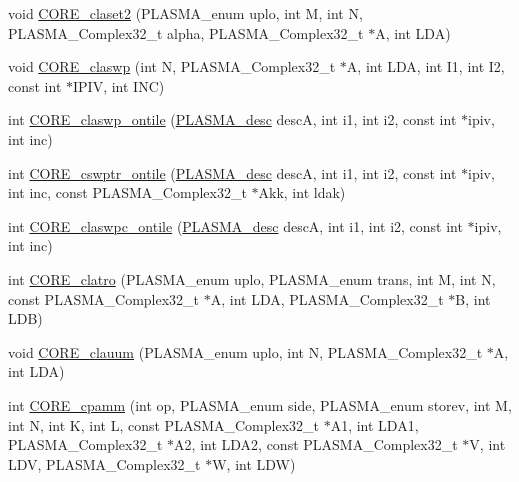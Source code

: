\begin{DoxyCompactItemize}
\item 
void \hyperlink{group__CORE__PLASMA__Complex32__t_gac08e91310fd70351d27546eb488fbd81_gac08e91310fd70351d27546eb488fbd81}{C\+O\+R\+E\+\_\+claset2} (P\+L\+A\+S\+M\+A\+\_\+enum uplo, int M, int N, P\+L\+A\+S\+M\+A\+\_\+\+Complex32\+\_\+t alpha, P\+L\+A\+S\+M\+A\+\_\+\+Complex32\+\_\+t $\ast$A, int L\+D\+A)
\item 
void \hyperlink{group__CORE__PLASMA__Complex32__t_gae932091627c46b688b67aebcfb537573_gae932091627c46b688b67aebcfb537573}{C\+O\+R\+E\+\_\+claswp} (int N, P\+L\+A\+S\+M\+A\+\_\+\+Complex32\+\_\+t $\ast$A, int L\+D\+A, int I1, int I2, const int $\ast$I\+P\+I\+V, int I\+N\+C)
\item 
int \hyperlink{group__CORE__PLASMA__Complex32__t_ga18336def276ef2189f9e51afc1976624_ga18336def276ef2189f9e51afc1976624}{C\+O\+R\+E\+\_\+claswp\+\_\+ontile} (\hyperlink{structplasma__desc__t}{P\+L\+A\+S\+M\+A\+\_\+desc} desc\+A, int i1, int i2, const int $\ast$ipiv, int inc)
\item 
int \hyperlink{group__CORE__PLASMA__Complex32__t_gaf715646956e16c2ad05d66b58fc8ffad_gaf715646956e16c2ad05d66b58fc8ffad}{C\+O\+R\+E\+\_\+cswptr\+\_\+ontile} (\hyperlink{structplasma__desc__t}{P\+L\+A\+S\+M\+A\+\_\+desc} desc\+A, int i1, int i2, const int $\ast$ipiv, int inc, const P\+L\+A\+S\+M\+A\+\_\+\+Complex32\+\_\+t $\ast$Akk, int ldak)
\item 
int \hyperlink{group__CORE__PLASMA__Complex32__t_ga50a473e33ed85bf4b07d1b9a441a9731_ga50a473e33ed85bf4b07d1b9a441a9731}{C\+O\+R\+E\+\_\+claswpc\+\_\+ontile} (\hyperlink{structplasma__desc__t}{P\+L\+A\+S\+M\+A\+\_\+desc} desc\+A, int i1, int i2, const int $\ast$ipiv, int inc)
\item 
int \hyperlink{group__CORE__PLASMA__Complex32__t_gafe9ffac6e225949a3a0d13f084db12cb_gafe9ffac6e225949a3a0d13f084db12cb}{C\+O\+R\+E\+\_\+clatro} (P\+L\+A\+S\+M\+A\+\_\+enum uplo, P\+L\+A\+S\+M\+A\+\_\+enum trans, int M, int N, const P\+L\+A\+S\+M\+A\+\_\+\+Complex32\+\_\+t $\ast$A, int L\+D\+A, P\+L\+A\+S\+M\+A\+\_\+\+Complex32\+\_\+t $\ast$B, int L\+D\+B)
\item 
void \hyperlink{group__CORE__PLASMA__Complex32__t_ga524ade90166bbf2514e1259685dc603e_ga524ade90166bbf2514e1259685dc603e}{C\+O\+R\+E\+\_\+clauum} (P\+L\+A\+S\+M\+A\+\_\+enum uplo, int N, P\+L\+A\+S\+M\+A\+\_\+\+Complex32\+\_\+t $\ast$A, int L\+D\+A)
\item 
int \hyperlink{group__CORE__PLASMA__Complex32__t_ga1cba20dafe66a5e6fd0ba87604120002_ga1cba20dafe66a5e6fd0ba87604120002}{C\+O\+R\+E\+\_\+cpamm} (int op, P\+L\+A\+S\+M\+A\+\_\+enum side, P\+L\+A\+S\+M\+A\+\_\+enum storev, int M, int N, int K, int L, const P\+L\+A\+S\+M\+A\+\_\+\+Complex32\+\_\+t $\ast$A1, int L\+D\+A1, P\+L\+A\+S\+M\+A\+\_\+\+Complex32\+\_\+t $\ast$A2, int L\+D\+A2, const P\+L\+A\+S\+M\+A\+\_\+\+Complex32\+\_\+t $\ast$V, int L\+D\+V, P\+L\+A\+S\+M\+A\+\_\+\+Complex32\+\_\+t $\ast$W, int L\+D\+W)

\end{DoxyCompactItemize}

